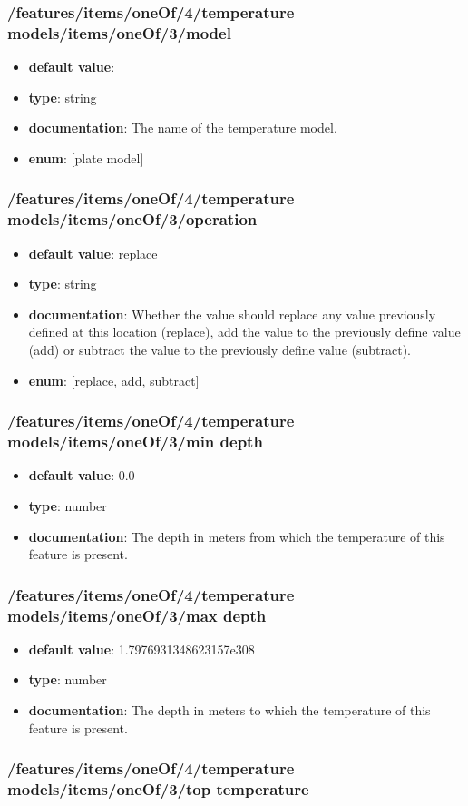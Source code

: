 \subsubsection{/features/items/oneOf/4/temperature models/items/oneOf/3/model}
\begin{itemize}\item {\bf default value}: 
\item {\bf type}: string
\item {\bf documentation}: The name of the temperature model.
\item {\bf enum}: [plate model]\end{itemize}\subsubsection{/features/items/oneOf/4/temperature models/items/oneOf/3/operation}
\begin{itemize}\item {\bf default value}: replace
\item {\bf type}: string
\item {\bf documentation}: Whether the value should replace any value previously defined at this location (replace), add the value to the previously define value (add) or subtract the value to the previously define value (subtract).
\item {\bf enum}: [replace, add, subtract]\end{itemize}\subsubsection{/features/items/oneOf/4/temperature models/items/oneOf/3/min depth}
\begin{itemize}\item {\bf default value}: 0.0
\item {\bf type}: number
\item {\bf documentation}: The depth in meters from which the temperature of this feature is present.
\end{itemize}\subsubsection{/features/items/oneOf/4/temperature models/items/oneOf/3/max depth}
\begin{itemize}\item {\bf default value}: 1.7976931348623157e308
\item {\bf type}: number
\item {\bf documentation}: The depth in meters to which the temperature of this feature is present.
\end{itemize}\subsubsection{/features/items/oneOf/4/temperature models/items/oneOf/3/top temperature}
